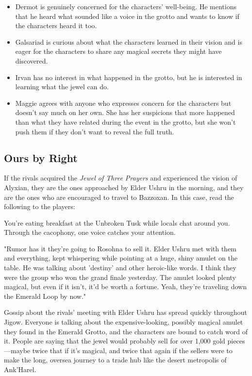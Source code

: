 \documentclass[10pt,a4paper,twoside,fancy,bg=print,twocolumn,openany,nodeprecatedcode]{dndbook}
\begin{document}
\begin{itemize}
\item Dermot is genuinely concerned for the characters' well-being. He mentions that he heard what sounded like a voice in the grotto and wants to know if the characters heard it too.
\item Galsariad is curious about what the characters learned in their vision and is eager for the characters to share any magical secrets they might have discovered.
\item Irvan has no interest in what happened in the grotto, but he is interested in learning what the jewel can do.
\item Maggie agrees with anyone who expresses concern for the characters but doesn't say much on her own. She has her suspicions that more happened than what they have related during the event in the grotto, but she won't push them if they don't want to reveal the full truth.
\end{itemize}

\subsection{Ours by Right}
If the rivals acquired the \textit{Jewel of Three Prayers} and experienced the vision of Alyxian, they are the ones approached by Elder Ushru in the morning, and they are the ones who are encouraged to travel to Bazzoxan. In this case, read the following to the players:

\begin{DndReadAloud}{}
You're eating breakfast at the Unbroken Tusk while locals chat around you. Through the cacophony, one voice catches your attention.

"Rumor has it they're going to Rosohna to sell it. Elder Ushru met with them and everything, kept whispering while pointing at a huge, shiny amulet on the table. He was talking about 'destiny' and other heroic-like words. I think they were the group who won the grand finale yesterday. The amulet looked plenty magical, but even if it isn't, it'd be worth a fortune. Yeah, they're traveling down the Emerald Loop by now."

\end{DndReadAloud}

Gossip about the rivals' meeting with Elder Ushru has spread quickly throughout Jigow. Everyone is talking about the expensive-looking, possibly magical amulet they found in the Emerald Grotto, and the characters are bound to catch word of it. People are saying that the jewel would probably sell for over 1,000 gold pieces—maybe twice that if it's magical, and twice that again if the sellers were to make the long, oversea journey to a trade hub like the desert metropolis of Ank'Harel.
\end{document}
